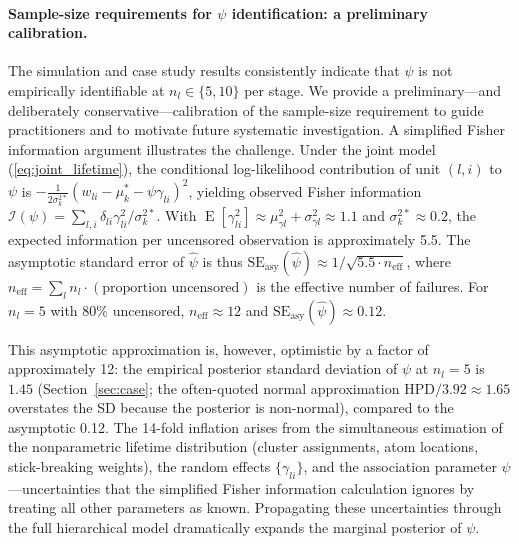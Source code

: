 \documentclass[a4paper,fleqn,longmktitle]{cas-sc}
\DeclareMathOperator{\E}{E}
\begin{document}
\paragraph{Sample-size requirements for $\psi$ identification: a preliminary calibration.}
The simulation and case study results consistently indicate that $\psi$ is not empirically identifiable at $n_l \in \{5, 10\}$ per stage. We provide a preliminary---and deliberately conservative---calibration of the sample-size requirement to guide practitioners and to motivate future systematic investigation. A simplified Fisher information argument illustrates the challenge. Under the joint model (\ref{eq:joint_lifetime}), the conditional log-likelihood contribution of unit $(l,i)$ to $\psi$ is $-\frac{1}{2\sigma_k^{2*}}(w_{li} - \mu_k^* - \psi\gamma_{li})^2$, yielding observed Fisher information $\mathcal{I}(\psi) = \sum_{l,i} \delta_{li} \gamma_{li}^2 / \sigma_k^{2*}$. With $\E[\gamma_{li}^2] \approx \mu_{\gamma l}^2 + \sigma_{\gamma l}^2 \approx 1.1$ and $\sigma_k^{2*} \approx 0.2$, the expected information per uncensored observation is approximately 5.5. The asymptotic standard error of $\widehat{\psi}$ is thus $\mathrm{SE}_{\text{asy}}(\widehat{\psi}) \approx 1/\sqrt{5.5 \cdot n_{\text{eff}}}$, where $n_{\text{eff}} = \sum_l n_l \cdot (\text{proportion uncensored})$ is the effective number of failures. For $n_l = 5$ with 80\% uncensored, $n_{\text{eff}} \approx 12$ and $\mathrm{SE}_{\text{asy}}(\widehat{\psi}) \approx 0.12$.

This asymptotic approximation is, however, optimistic by a factor of approximately 12: the empirical posterior standard deviation of $\psi$ at $n_l=5$ is $1.45$ (Section~\ref{sec:case}; the often-quoted normal approximation $\text{HPD}/3.92 \approx 1.65$ overstates the SD because the posterior is non-normal), compared to the asymptotic 0.12. The 14-fold inflation arises from the simultaneous estimation of the nonparametric lifetime distribution (cluster assignments, atom locations, stick-breaking weights), the random effects $\{\gamma_{li}\}$, and the association parameter $\psi$---uncertainties that the simplified Fisher information calculation ignores by treating all other parameters as known. Propagating these uncertainties through the full hierarchical model dramatically expands the marginal posterior of $\psi$.
\end{document}

